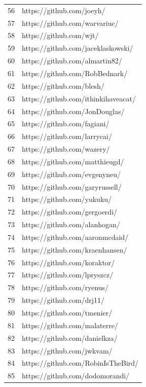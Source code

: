 \begin{center}
\begin{longtable}{|p{2cm}|p{7cm}|}
            56 & https://github.com/joeyh/ \\
            57 & https://github.com/warvariuc/ \\
            58 & https://github.com/wjt/ \\
            59 & https://github.com/jaceklaskowski/ \\
            60 & https://github.com/almartin82/ \\
            61 & https://github.com/RobBednark/ \\
            62 & https://github.com/blesh/ \\
            63 & https://github.com/ithinkihaveacat/ \\
            64 & https://github.com/JonDouglas/ \\
            65 & https://github.com/fagiani/ \\
            66 & https://github.com/larrycai/ \\
            67 & https://github.com/wazery/ \\
            68 & https://github.com/matthieugd/ \\
            69 & https://github.com/evgenyneu/ \\
            70 & https://github.com/garyrussell/ \\
            71 & https://github.com/yukuku/ \\
            72 & https://github.com/gergoerdi/ \\
            73 & https://github.com/alanhogan/ \\
            74 & https://github.com/aaronmcdaid/ \\
            75 & https://github.com/kraenhansen/ \\
            76 & https://github.com/koraktor/ \\
            77 & https://github.com/lpryszcz/ \\
            78 & https://github.com/ryenus/ \\
            79 & https://github.com/drj11/ \\
            80 & https://github.com/tmenier/ \\
            81 & https://github.com/malaterre/ \\
            82 & https://github.com/danielkza/ \\
            83 & https://github.com/jwkvam/ \\
            84 & https://github.com/RobinIsTheBird/ \\
            85 & https://github.com/dodomorandi/ \\

\end{longtable}
\end{center}
